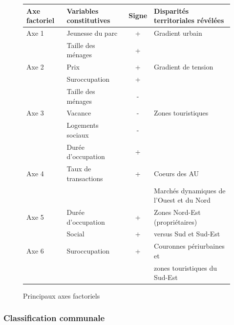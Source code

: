 \documentclass[12pt, a4paper]{article}
\begin{document}
\begin{figure}[H]
\caption{Principaux axes factoriels}
\begin{tabular}{| l | l | c | l |}
\hline
Axe factoriel & Variables constitutives       & Signe &  Disparités territoriales révélées \\
\hline
Axe 1         &Jeunesse du parc               & +    & Gradient urbain \\
              &  Taille des ménages             & +  &    \\
\hline
Axe 2         &Prix                           & +    & Gradient de tension \\
       & Suroccupation                  & +    & \\ 
      &Taille des ménages             & -  &   \\
\hline
Axe 3         &Vacance                        & -    & Zones touristiques \\
        &Logements sociaux              & -    &  \\
        &Durée d'occupation             & +    & \\
\hline
Axe 4         &Taux de transactions           & +    & Coeurs des AU  \\
                                           &  & & Marchés dynamiques de l'Ouest et du Nord \\
\hline
Axe 5         &Durée d'occupation             & +    & Zones Nord-Est (propriétaires) \\
        &Social                         & +    & versus Sud et Sud-Est \\
\hline
Axe 6         & Suroccupation                  & +    & Couronnes périurbaines et \\
                 & &                &  zones touristiques du Sud-Est \\
\hline
\end{tabular}
\end{figure} 

\vspace{.2cm}


\subsubsection{Classification communale}
\end{document}
